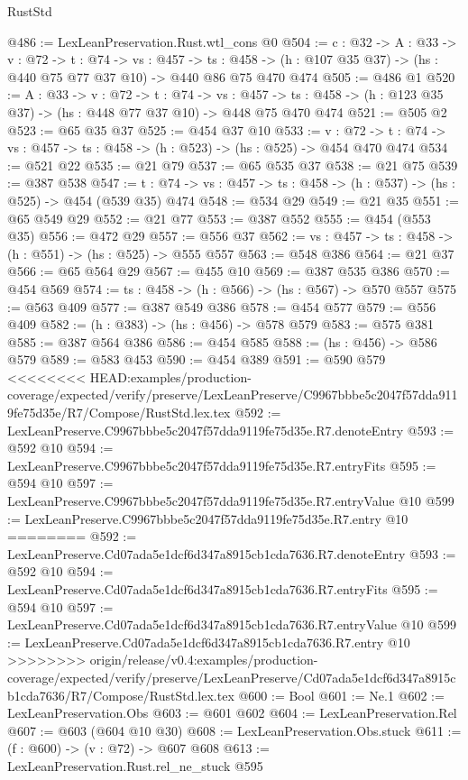 \begin{lexlean}{RustStd}
\begin{coremodule}
{\begin{coremodule}
@486 := LexLeanPreservation.Rust.wtl_cons @0
@504 := {c : @32} ->
  {A : @33} ->
  {v : @72} ->
  {t : @74} ->
  {vs : @457} ->
  {ts : @458} -> (h : @107 @35 @37) -> (hs : @440 @75 @77 @37 @10) -> @440 @86 @75 @470 @474
@505 := @486 @1
@520 := {A : @33} ->
  {v : @72} ->
  {t : @74} ->
  {vs : @457} -> {ts : @458} -> (h : @123 @35 @37) -> (hs : @448 @77 @37 @10) -> @448 @75 @470 @474
@521 := @505 @2
@523 := @65 @35 @37
@525 := @454 @37 @10
@533 := {v : @72} ->
  {t : @74} -> {vs : @457} -> {ts : @458} -> (h : @523) -> (hs : @525) -> @454 @470 @474
@534 := @521 @22
@535 := @21 @79
@537 := @65 @535 @37
@538 := @21 @75
@539 := @387 @538
@547 := {t : @74} -> {vs : @457} -> {ts : @458} -> (h : @537) -> (hs : @525) -> @454 (@539 @35) @474
@548 := @534 @29
@549 := @21 @35
@551 := @65 @549 @29
@552 := @21 @77
@553 := @387 @552
@555 := @454 (@553 @35)
@556 := @472 @29
@557 := @556 @37
@562 := {vs : @457} -> {ts : @458} -> (h : @551) -> (hs : @525) -> @555 @557
@563 := @548 @386
@564 := @21 @37
@566 := @65 @564 @29
@567 := @455 @10
@569 := @387 @535 @386
@570 := @454 @569
@574 := {ts : @458} -> (h : @566) -> (hs : @567) -> @570 @557
@575 := @563 @409
@577 := @387 @549 @386
@578 := @454 @577
@579 := @556 @409
@582 := (h : @383) -> (hs : @456) -> @578 @579
@583 := @575 @381
@585 := @387 @564 @386
@586 := @454 @585
@588 := (hs : @456) -> @586 @579
@589 := @583 @453
@590 := @454 @389
@591 := @590 @579
<<<<<<<< HEAD:examples/production-coverage/expected/verify/preserve/LexLeanPreserve/C9967bbbe5c2047f57dda9119fe75d35e/R7/Compose/RustStd.lex.tex
@592 := LexLeanPreserve.C9967bbbe5c2047f57dda9119fe75d35e.R7.denoteEntry
@593 := @592 @10
@594 := LexLeanPreserve.C9967bbbe5c2047f57dda9119fe75d35e.R7.entryFits
@595 := @594 @10
@597 := LexLeanPreserve.C9967bbbe5c2047f57dda9119fe75d35e.R7.entryValue @10
@599 := LexLeanPreserve.C9967bbbe5c2047f57dda9119fe75d35e.R7.entry @10
========
@592 := LexLeanPreserve.Cd07ada5e1dcf6d347a8915cb1cda7636.R7.denoteEntry
@593 := @592 @10
@594 := LexLeanPreserve.Cd07ada5e1dcf6d347a8915cb1cda7636.R7.entryFits
@595 := @594 @10
@597 := LexLeanPreserve.Cd07ada5e1dcf6d347a8915cb1cda7636.R7.entryValue @10
@599 := LexLeanPreserve.Cd07ada5e1dcf6d347a8915cb1cda7636.R7.entry @10
>>>>>>>> origin/release/v0.4:examples/production-coverage/expected/verify/preserve/LexLeanPreserve/Cd07ada5e1dcf6d347a8915cb1cda7636/R7/Compose/RustStd.lex.tex
@600 := Bool
@601 := Ne.{1}
@602 := LexLeanPreservation.Obs
@603 := @601 @602
@604 := LexLeanPreservation.Rel
@607 := @603 (@604 @10 @30)
@608 := LexLeanPreservation.Obs.stuck
@611 := (f : @600) -> (v : @72) -> @607 @608
@613 := LexLeanPreservation.Rust.rel_ne_stuck @595

\end{coremodule}}
\end{coremodule}
\end{lexlean}
